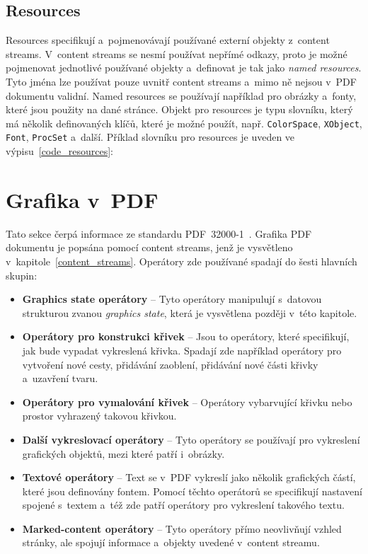 \subsection*{Resources} \label{resources}
Resources specifikují a~pojmenovávají používané externí objekty z~content streams.
V~content streams se nesmí používat nepřímé odkazy, proto je možné pojmenovat
jednotlivé používané objekty a~definovat je tak jako \emph{named resources}.
Tyto jména lze používat pouze uvnitř content streams a~mimo ně nejsou v~PDF
dokumentu validní. Named resources se používají například pro obrázky a~fonty,
které jsou použity na dané stránce. Objekt pro resources je typu slovníku, který
má několik definovaných klíčů, které je možné použít, např. \texttt{ColorSpace}, 
\texttt{XObject}, \texttt{Font}, \texttt{ProcSet} a~další. Příklad slovníku pro
resources je uveden ve výpisu~\ref{code_resources}:



\section{Grafika v~PDF}
Tato sekce čerpá informace ze standardu PDF~32000-1~\cite[k.~8, s.~110--236]{PDF32000-1:2008}.
Grafika PDF dokumentu je popsána pomocí content streams, jenž je vysvětleno
v~kapitole~\ref{content_streams}. Operátory zde používané spadají do šesti
hlavních skupin:
\begin{itemize}
    \item \textbf{Graphics state operátory} -- Tyto operátory manipulují
    s~datovou strukturou zvanou \emph{graphics state}, která je vysvětlena později
    v~této kapitole.
    \item \textbf{Operátory pro konstrukci křivek} -- Jsou to operátory, které
    specifikují, jak bude vypadat vykreslená křivka. Spadají zde například
    operátory pro vytvoření nové cesty, přidávání zaoblení, přidávání nové části
    křivky a~uzavření tvaru.
    \item \textbf{Operátory pro vymalování křivek} -- Operátory vybarvující
    křivku nebo prostor vyhrazený takovou křivkou.
    \item \textbf{Další vykreslovací operátory} -- Tyto operátory se používají
    pro vykreslení grafických objektů, mezi které patří i~obrázky.
    \item \textbf{Textové operátory} -- Text se v~PDF vykreslí jako několik
    grafických částí, které jsou definovány fontem. Pomocí těchto operátorů
    se specifikují nastavení spojené s~textem a~též zde patří operátory pro
    vykreslení takového textu. 
    \item \textbf{Marked-content operátory} -- Tyto operátory přímo neovlivňují
    vzhled stránky, ale spojují informace a~objekty uvedené v~content streamu.
\end{itemize}


